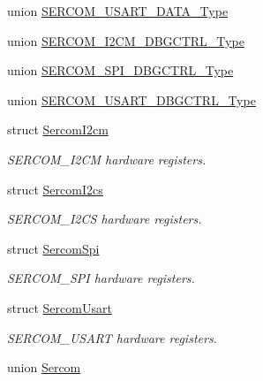 \begin{DoxyCompactItemize}
\item 
union \mbox{\hyperlink{union_s_e_r_c_o_m___u_s_a_r_t___d_a_t_a___type}{S\+E\+R\+C\+O\+M\+\_\+\+U\+S\+A\+R\+T\+\_\+\+D\+A\+T\+A\+\_\+\+Type}}
\item 
union \mbox{\hyperlink{union_s_e_r_c_o_m___i2_c_m___d_b_g_c_t_r_l___type}{S\+E\+R\+C\+O\+M\+\_\+\+I2\+C\+M\+\_\+\+D\+B\+G\+C\+T\+R\+L\+\_\+\+Type}}
\item 
union \mbox{\hyperlink{union_s_e_r_c_o_m___s_p_i___d_b_g_c_t_r_l___type}{S\+E\+R\+C\+O\+M\+\_\+\+S\+P\+I\+\_\+\+D\+B\+G\+C\+T\+R\+L\+\_\+\+Type}}
\item 
union \mbox{\hyperlink{union_s_e_r_c_o_m___u_s_a_r_t___d_b_g_c_t_r_l___type}{S\+E\+R\+C\+O\+M\+\_\+\+U\+S\+A\+R\+T\+\_\+\+D\+B\+G\+C\+T\+R\+L\+\_\+\+Type}}
\item 
struct \mbox{\hyperlink{struct_sercom_i2cm}{Sercom\+I2cm}}
\begin{DoxyCompactList}\small\item\em S\+E\+R\+C\+O\+M\+\_\+\+I2\+CM hardware registers. \end{DoxyCompactList}\item 
struct \mbox{\hyperlink{struct_sercom_i2cs}{Sercom\+I2cs}}
\begin{DoxyCompactList}\small\item\em S\+E\+R\+C\+O\+M\+\_\+\+I2\+CS hardware registers. \end{DoxyCompactList}\item 
struct \mbox{\hyperlink{struct_sercom_spi}{Sercom\+Spi}}
\begin{DoxyCompactList}\small\item\em S\+E\+R\+C\+O\+M\+\_\+\+S\+PI hardware registers. \end{DoxyCompactList}\item 
struct \mbox{\hyperlink{struct_sercom_usart}{Sercom\+Usart}}
\begin{DoxyCompactList}\small\item\em S\+E\+R\+C\+O\+M\+\_\+\+U\+S\+A\+RT hardware registers. \end{DoxyCompactList}\item 
union \mbox{\hyperlink{union_sercom}{Sercom}}
\end{DoxyCompactItemize}
